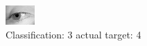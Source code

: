 \begin{figure}[h!]
\begin{center}
\includegraphics[width=0.60\columnwidth]{figures/ID2895_class_3_target_4.png}
\end{center}
\caption{ Classification: 3 actual target: 4}
\label{fig:ID2895_class_3_target_4}
\end{figure}
